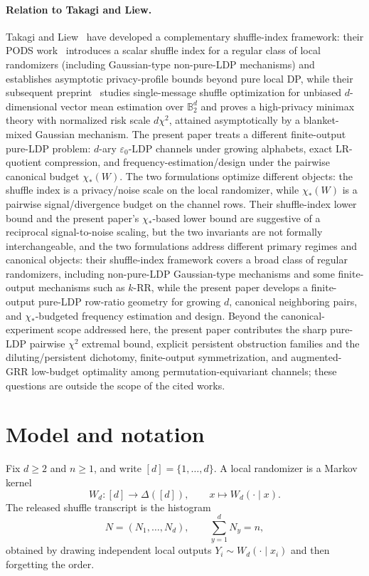 \documentclass[11pt]{amsart}
\numberwithin{equation}{section}
\theoremstyle{definition}
\begin{document}
\paragraph{Relation to Takagi and Liew.}
Takagi and Liew~\cite{TakagiLiew2026,TakagiLiew2604} have developed a complementary shuffle-index
framework: their PODS work~\cite{TakagiLiew2026} introduces a scalar shuffle index for a regular
class of local randomizers (including Gaussian-type non-pure-LDP mechanisms) and establishes
asymptotic privacy-profile bounds beyond pure local DP, while their subsequent
preprint~\cite{TakagiLiew2604} studies single-message shuffle optimization for unbiased
$d$-dimensional vector mean estimation over $\mathbb B_2^d$ and proves a high-privacy minimax
theory with normalized risk scale $d\chi^2$, attained asymptotically by a blanket-mixed Gaussian
mechanism.  The present paper treats a different finite-output pure-LDP problem: $d$-ary
$\varepsilon_0$-LDP channels under growing alphabets, exact LR-quotient compression, and
frequency-estimation/design under the pairwise canonical budget $\chi_\ast(W)$.  The two
formulations optimize different objects: the shuffle index is a privacy/noise scale on the local
randomizer, while $\chi_\ast(W)$ is a pairwise signal/divergence budget on the channel rows.
Their shuffle-index lower bound and the present paper's $\chi_\ast$-based lower bound are
suggestive of a reciprocal signal-to-noise scaling, but the two invariants are not formally
interchangeable, and the two formulations address different primary regimes and canonical
objects: their shuffle-index framework covers a broad class of regular randomizers, including
non-pure-LDP Gaussian-type mechanisms and some finite-output mechanisms such as $k$-RR, while
the present paper develops a finite-output pure-LDP row-ratio geometry for growing $d$, canonical
neighboring pairs, and $\chi_\ast$-budgeted frequency estimation and design.  Beyond the
canonical-experiment scope addressed here, the present paper contributes the sharp pure-LDP
pairwise $\chi^2$ extremal bound, explicit persistent obstruction families and the
diluting/persistent dichotomy, finite-output symmetrization, and augmented-GRR low-budget
optimality among permutation-equivariant channels; these questions are outside the scope of the
cited works.

\section{Model and notation}

Fix $d \ge 2$ and $n \ge 1$, and write $[d]=\{1,\dots,d\}$.
A local randomizer is a Markov kernel
\[
W_d : [d] \to \Delta([d]),
\qquad
x \mapsto W_d(\cdot\mid x).
\]
The released shuffle transcript is the histogram
\[
N=(N_1,\dots,N_d), \qquad \sum_{y=1}^d N_y = n,
\]
obtained by drawing independent local outputs
$Y_i \sim W_d(\cdot\mid x_i)$ and then forgetting the order.
\end{document}
